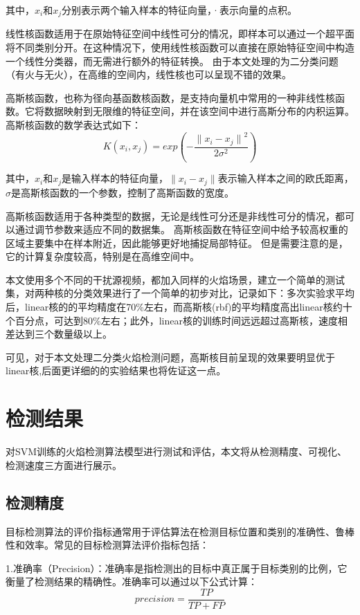 其中，$x_i$和$x_j$分别表示两个输入样本的特征向量，·表示向量的点积。

线性核函数适用于在原始特征空间中线性可分的情况，即样本可以通过一个超平面将不同类别分开。在这种情况下，使用线性核函数可以直接在原始特征空间中构造一个线性分类器，而无需进行额外的特征转换。
由于本文处理的为二分类问题（有火与无火），在高维的空间内，线性核也可以呈现不错的效果。

高斯核函数，也称为径向基函数核函数，是支持向量机中常用的一种非线性核函数。它将数据映射到无限维的特征空间，并在该空间中进行高斯分布的内积运算。
高斯核函数的数学表达式如下：
\begin{equation} 
    K(x_i,x_j)=exp(-\frac{{\lVert x_i-x_j \rVert}^2}{2\sigma^2})
\end{equation}

其中，$x_i$和$x_j$是输入样本的特征向量，$\lVert x_i-x_j \rVert$表示输入样本之间的欧氏距离，$\sigma$是高斯核函数的一个参数，控制了高斯函数的宽度。

高斯核函数适用于各种类型的数据，无论是线性可分还是非线性可分的情况，都可以通过调节参数来适应不同的数据集。
高斯核函数在特征空间中给予较高权重的区域主要集中在样本附近，因此能够更好地捕捉局部特征。
但是需要注意的是，它的计算复杂度较高，特别是在高维空间中。

本文使用多个不同的干扰源视频，都加入同样的火焰场景，建立一个简单的测试集，对两种核的分类效果进行了一个简单的初步对比，记录如下：多次实验求平均后，linear核的的平均精度在70\%左右，而高斯核(rbf)的平均精度高出linear核约十个百分点，可达到80\%左右；此外，linear核的训练时间远远超过高斯核，速度相差达到三个数量级以上。

可见，对于本文处理二分类火焰检测问题，高斯核目前呈现的效果要明显优于linear核,后面更详细的的实验结果也将佐证这一点。
\section{检测结果}
对SVM训练的火焰检测算法模型进行测试和评估，本文将从检测精度、可视化、检测速度三方面进行展示。
\subsection{检测精度}
目标检测算法的评价指标通常用于评估算法在检测目标位置和类别的准确性、鲁棒性和效率。常见的目标检测算法评价指标包括：

1.准确率（Precision）：准确率是指检测出的目标中真正属于目标类别的比例，它衡量了检测结果的精确性。准确率可以通过以下公式计算：
\begin{equation} 
    precision=\frac{TP}{TP+FP}
\end{equation}

